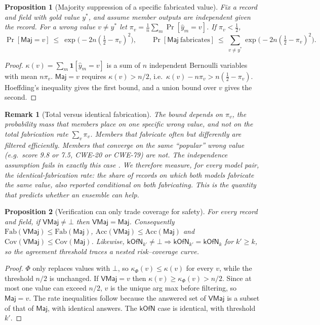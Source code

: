 \documentclass[11pt]{article}
\newtheorem{proposition}{Proposition}[section]
\newtheorem{remark}{Remark}[section]
\newcommand{\Fab}{\mathrm{Fab}}\newcommand{\Acc}{\mathrm{Acc}}\newcommand{\Abs}{\mathrm{Abs}}
\newcommand{\Cov}{\mathrm{Cov}}
\begin{document}
\begin{proposition}[Majority suppression of a specific fabricated value]\label{prop:hoeffding}
Fix a record and field with gold value $y^*$, and assume member outputs are independent given the record. For a wrong value $v\neq y^*$ let $\pi_v=\frac1n\sum_m\Pr[\hat y_m=v]$. If $\pi_v<\tfrac12$,
\begin{equation}
\Pr[\mathsf{Maj}=v]\ \le\ \exp\!\big(-2n(\tfrac12-\pi_v)^2\big),\qquad
\Pr[\mathsf{Maj}\ \text{fabricates}]\ \le\ \textstyle\sum_{v\neq y^*}\exp\!\big(-2n(\tfrac12-\pi_v)^2\big).
\end{equation}
\end{proposition}
\begin{proof}
$\kappa(v)=\sum_m \mathbf{1}[\hat y_m=v]$ is a sum of $n$ independent Bernoulli variables with mean $n\pi_v$. $\mathsf{Maj}=v$ requires $\kappa(v)>n/2$, i.e.\ $\kappa(v)-n\pi_v>n(\tfrac12-\pi_v)$. Hoeffding's inequality \citep{hoeffding1963} gives the first bound, and a union bound over $v$ gives the second.
\end{proof}

\begin{remark}[Total versus identical fabrication]\label{rem:identical}
The bound depends on $\pi_v$, the probability mass that members place on \emph{one specific} wrong value, and not on the total fabrication rate $\sum_v\pi_v$. Members that fabricate often but \emph{differently} are filtered efficiently. Members that converge on the same ``popular'' wrong value (e.g.\ score 9.8 or 7.5, CWE-20 or CWE-79) are not. The independence assumption fails in exactly this case \citep{kim2025correlated}. We therefore measure, for every model pair, the \emph{identical-fabrication rate}: the share of records on which both models fabricate \emph{the same} value, also reported conditional on both fabricating. This is the quantity that predicts whether an ensemble can help.
\end{remark}

\begin{proposition}[Verification can only trade coverage for safety]\label{prop:verified}
For every record and field, if $\mathsf{VMaj}\neq\bot$ then $\mathsf{VMaj}=\mathsf{Maj}$. Consequently $\Fab(\mathsf{VMaj})\le\Fab(\mathsf{Maj})$, $\Acc(\mathsf{VMaj})\le\Acc(\mathsf{Maj})$ and $\Cov(\mathsf{VMaj})\le\Cov(\mathsf{Maj})$. Likewise, $\mathsf{kOfN}_{k'}\neq\bot\Rightarrow\mathsf{kOfN}_{k'}=\mathsf{kOfN}_{k}$ for $k'\ge k$, so the agreement threshold traces a nested risk--coverage curve.
\end{proposition}
\begin{proof}
$\Phi$ only replaces values with $\bot$, so $\kappa_\Phi(v)\le\kappa(v)$ for every $v$, while the threshold $n/2$ is unchanged. If $\mathsf{VMaj}=v$ then $\kappa(v)\ge\kappa_\Phi(v)>n/2$. Since at most one value can exceed $n/2$, $v$ is the unique arg max before filtering, so $\mathsf{Maj}=v$. The rate inequalities follow because the answered set of $\mathsf{VMaj}$ is a subset of that of $\mathsf{Maj}$, with identical answers. The $\mathsf{kOfN}$ case is identical, with threshold $k'$.
\end{proof}
\end{document}
